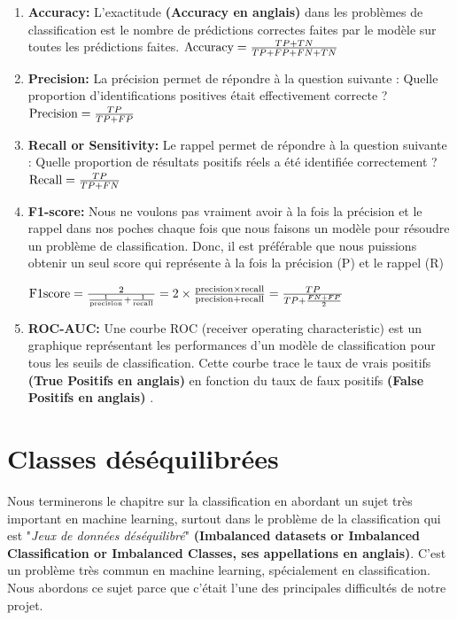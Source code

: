 \documentclass[12pt, french]{report}
\begin{document}
\begin{enumerate}
\item \textbf{Accuracy:}
L'exactitude \textbf{(Accuracy en anglais)} dans les problèmes de classification est le nombre de prédictions correctes faites par le modèle sur toutes les prédictions faites.
$\textnormal{Accuracy} = \frac{TP+TN}{TP+ FP + FN + TN} $

\item  \textbf{Precision:} 
La précision permet de répondre à la question suivante : Quelle proportion d'identifications positives était effectivement correcte ?
$\textnormal{Precision} = \frac{TP}{TP+ FP} $

\item \textbf{Recall or Sensitivity:}
Le rappel permet de répondre à la question suivante : Quelle proportion de résultats positifs réels a été identifiée correctement ?
$\textnormal{Recall} = \frac{TP}{TP+ FN} $
 
 \item \textbf{F1-score:}
 Nous ne voulons pas vraiment avoir à la fois la précision et le rappel dans nos poches chaque fois que nous faisons un modèle pour résoudre un problème de classification. Donc, il est préférable que nous puissions obtenir un seul score qui représente à la fois la précision (P) et le rappel (R)
 
 $ \textnormal{F1score} = \frac{ 2 }{\frac {1}{\textnormal{precision}} +  \frac {1}{\textnormal{recall}}  } = 2 \times \frac{\textnormal{precision} \times \textnormal{recall}} { \textnormal{precision} + \textnormal{recall} } = \frac{TP} {TP + \frac{FN+FP} {2} } $
 
 \item \textbf{ROC-AUC:}
Une courbe ROC (receiver operating characteristic) est un graphique représentant les performances d'un modèle de classification pour tous les seuils de classification. Cette courbe trace le taux de vrais positifs \textbf{(True Positifs en anglais)} en fonction du taux de faux positifs \textbf{(False Positifs en anglais)} \cite{key18}.
\end{enumerate}

\section{Classes déséquilibrées}

Nous terminerons le chapitre sur la classification en abordant un sujet très important en machine learning, surtout dans le problème de la classification qui est "\textit{Jeux de données déséquilibré}" \textbf{(Imbalanced datasets or Imbalanced Classification or Imbalanced Classes, ses appellations en anglais)}. C'est un problème très commun en machine learning, spécialement en classification. Nous abordons ce sujet parce que c'était l'une des principales difficultés de notre projet. \\
\end{document}

